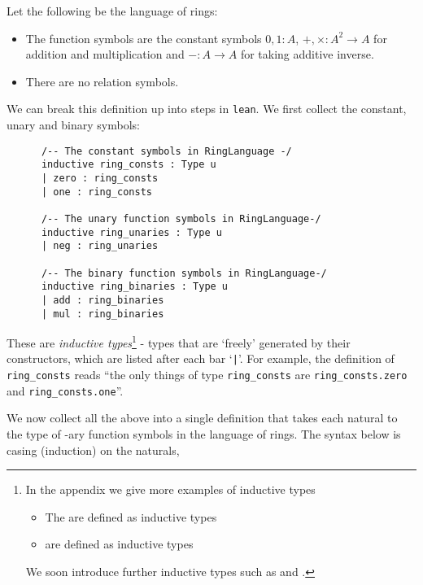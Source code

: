 \begin{dfn}
    Let the following be the language of rings:
    \begin{itemize}
        \item The function symbols are the constant symbols $0, 1 : A$,
        $+ , \times : A^2 \to A$ for addition and multiplication
        and $- : A \to A$ for taking additive inverse.
        \item There are no relation symbols.
    \end{itemize}

    We can break this definition up into steps in \texttt{lean}.
    We first collect the constant, unary and binary symbols:

    \begin{lstlisting}
      /-- The constant symbols in RingLanguage -/
      inductive ring_consts : Type u
      | zero : ring_consts
      | one : ring_consts

      /-- The unary function symbols in RingLanguage-/
      inductive ring_unaries : Type u
      | neg : ring_unaries

      /-- The binary function symbols in RingLanguage-/
      inductive ring_binaries : Type u
      | add : ring_binaries
      | mul : ring_binaries\end{lstlisting}

    These are \textit{inductive types}\footnote{
    In the appendix we give more examples of inductive types
    \begin{itemize}
      \item The  are defined as inductive types
      \item {} are defined as inductive types
    \end{itemize}
    We soon introduce further inductive types such as
     and . } -
    types that are `freely' generated by their constructors,
    which are listed after each bar `\texttt{|}'.
    For example, the definition of \texttt{ring\_consts} reads
    ``the only things of type \texttt{ring\_consts} are
    \texttt{ring\_consts.zero} and \texttt{ring\_consts.one}''.

    We now collect all the above into a single definition 
    that takes each natural  to the type of -ary
    function symbols in the language of rings.
    The syntax below is casing (induction) on the naturals,


\end{dfn}
